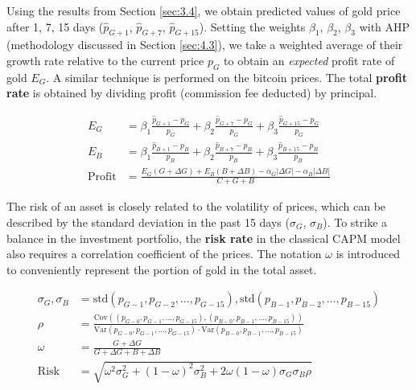 \documentclass{mcmthesis}
\begin{document}
{	Using the results from Section \ref{sec:3.4}, we obtain predicted values of gold price after 1, 7, 15 days ($\hat{p}_{G+1}$, $\hat{p}_{G+7}$, $\hat{p}_{G+15}$). Setting the weights $\beta_1$, $\beta_2$, $\beta_3$ with AHP (methodology discussed in Section \ref{sec:4.3}), we take a weighted average of their growth rate relative to the current price $p_G$ to obtain an \textit{expected} profit rate of gold $E_G$. A similar technique is performed on the bitcoin prices. The total \textbf{profit rate} is obtained by dividing profit (commission fee deducted) by principal. 
	
	\begin{align}
		E_G & = \beta_1 \frac{\hat{p}_{G+1}-p_G}{p_G} + \beta_2 \frac{\hat{p}_{G+7}-p_G}{p_G} + \beta_3 \frac{\hat{p}_{G+15}-p_G}{p_G} \\
		E_B & = \beta_1 \frac{\hat{p}_{B+1}-p_B}{p_B} + \beta_2 \frac{\hat{p}_{B+7}-p_B}{p_B} + \beta_3 \frac{\hat{p}_{B+15}-p_B}{p_B} \\
		\textrm{Profit} & = \frac {E_G\left(G+\Delta G\right) + E_B\left(B+\Delta B\right) - \alpha_G|\Delta G| - \alpha_B|\Delta B|} {C+G+B}
	\end{align}
	
	The risk of an asset is closely related to the volatility of prices, which can be described by the standard deviation in the past 15 days ($\sigma_G$, $\sigma_B$). To strike a balance in the investment portfolio, the \textbf{risk rate} in the classical CAPM model also requires a correlation coefficient of the prices. The notation $\omega$ is introduced to conveniently represent the portion of gold in the total asset. 
	
	\begin{align}
		\sigma_G, \sigma_B & = \textrm{std} \left(p_{G-1}, p_{G-2}, \ldots, p_{G-15}\right), \textrm{std} \left(p_{B-1}, p_{B-2}, \ldots, p_{B-15}\right) \\
		\rho & = \frac {\textrm{Cov}\left(\left(p_{G-0}, p_{G-1}, \ldots, p_{G-15}\right), \left(p_{B-0}, p_{B-1}, \ldots, p_{B-15}\right)\right)} {\textrm{Var}\left(p_{G-0}, p_{G-1}, \ldots, p_{G-15}\right) \cdot \textrm{Var}\left(p_{B-0}, p_{B-1}, \ldots, p_{B-15}\right)} \\
		\omega & = \frac {G+\Delta G} {G+\Delta G+B+\Delta B} \\
		\textrm{Risk} & = {\sqrt{\omega^2 \sigma_G^2 + \left(1-\omega\right)^2 \sigma_B^2 + 2 \omega \left(1-\omega\right) \sigma_G \sigma_B \rho}}
	\end{align}

}
\end{document}
